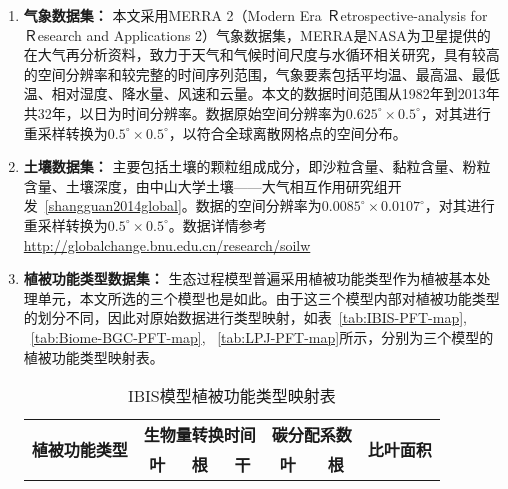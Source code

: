 \begin{enumerate}[(1)]
    \item \textbf{气象数据集：}
    本文采用MERRA 2（Modern Era Ｒetrospective-analysis for Ｒesearch and
    Applications 2）气象数据集，MERRA是NASA为卫星提供的在大气再分析资料，致力于天气和气候时间尺度与水循环相关研究，具有较高的空间分辨率和较完整的时间序列范围，气象要素包括平均温、最高温、最低温、相对湿度、降水量、风速和云量。本文的数据时间范围从1982年到2013年共32年，以日为时间分辨率。数据原始空间分辨率为$0.625^{\circ} \times 0.5^{\circ}$，对其进行重采样转换为$0.5^{\circ} \times 0.5^{\circ}$，以符合全球离散网格点的空间分布。

    \item \textbf{土壤数据集：}
    主要包括土壤的颗粒组成成分，即沙粒含量、黏粒含量、粉粒含量、土壤深度，由中山大学土壤——大气相互作用研究组开发~\ref{shangguan2014global}。数据的空间分辨率为$0.0085^{\circ} \times 0.0107^{\circ}$，对其进行重采样转换为$0.5^{\circ} \times 0.5^{\circ}$。数据详情参考 \href{http://globalchange.bnu.edu.cn/research/soilw}{http://globalchange.bnu.edu.cn/research/soilw}

    \item \textbf{植被功能类型数据集：}
    生态过程模型普遍采用植被功能类型作为植被基本处理单元，本文所选的三个模型也是如此。由于这三个模型内部对植被功能类型的划分不同，因此对原始数据进行类型映射，如表~\ref{tab:IBIS-PFT-map}, ~\ref{tab:Biome-BGC-PFT-map}, ~\ref{tab:LPJ-PFT-map}所示，分别为三个模型的植被功能类型映射表。

    \begin{table}
        \centering
        \caption{IBIS模型植被功能类型映射表}
        \label{tab:IBIB-PFT-map}
        \begin{threeparttable}
            \begin{tabular}{lcccccc}
                \toprule 
                \multirow{2}{*}{\textbf{植被功能类型}} & \multicolumn{3}{c}{\textbf{生物量转换时间}} & \multicolumn{2}{c}{\textbf{碳分配系数}} & \multirow{2}{*}{\textbf{比叶面积}} \\ 
                \cmidrule(lr){2-4} \cmidrule(lr){5-6}
                & \textbf{叶} & \textbf{根} & \textbf{干} & \textbf{叶} & \textbf{根} &  \\ 
                \midrule
                \bottomrule
            \end{tabular}
        \end{threeparttable}
    \end{table}


\end{enumerate}
